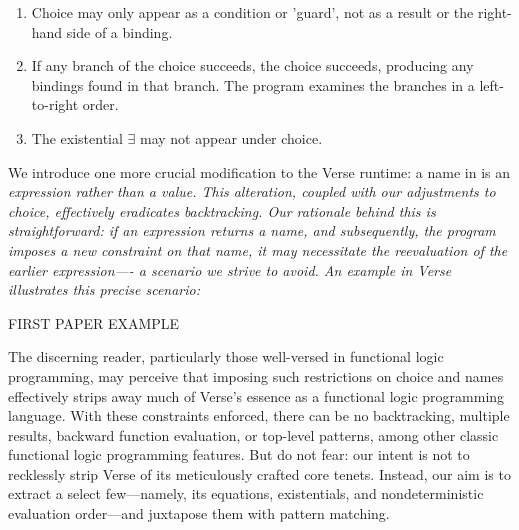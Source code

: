\documentclass[manuscript,screen,review, 12pt]{acmart}
\begin{document}
        \begin{enumerate}
        \item Choice may only appear as a condition or 'guard', not as a result
        or the right-hand side of a binding.
        \item If any branch of the choice succeeds, the choice succeeds,
        producing any bindings found in that branch. The program examines the
        branches in a left-to-right order.
        \item The existential $\exists$ may not appear under choice.
        \end{enumerate}

        We introduce one more crucial modification to the Verse runtime: a name
        in \VMinus is an \it{expression} rather than a \it{value}. This
        alteration, coupled with our adjustments to choice, effectively
         eradicates backtracking. Our rationale
        behind this is straightforward: if an expression returns a name, and
        subsequently, the program imposes a new constraint on that name, it may
        necessitate the reevaluation of the earlier expression—- a scenario we
        strive to avoid. An example in Verse illustrates this precise scenario:

        FIRST PAPER EXAMPLE 

        

        
        
        
        


        The discerning reader, particularly those well-versed in functional
        logic programming, may perceive that imposing such restrictions on
        choice and names effectively strips away much of Verse's essence as a
        functional logic programming language. With these constraints enforced,
        there can be no backtracking, multiple results, backward function
        evaluation, or top-level patterns, among other classic functional logic
        programming features. But do not fear: our intent is not to recklessly
        strip Verse of its meticulously crafted core tenets. Instead, our aim is
        to extract a select few—namely, its equations, existentials, and
        nondeterministic evaluation order—and juxtapose them with pattern
        matching.

    
\end{document}
